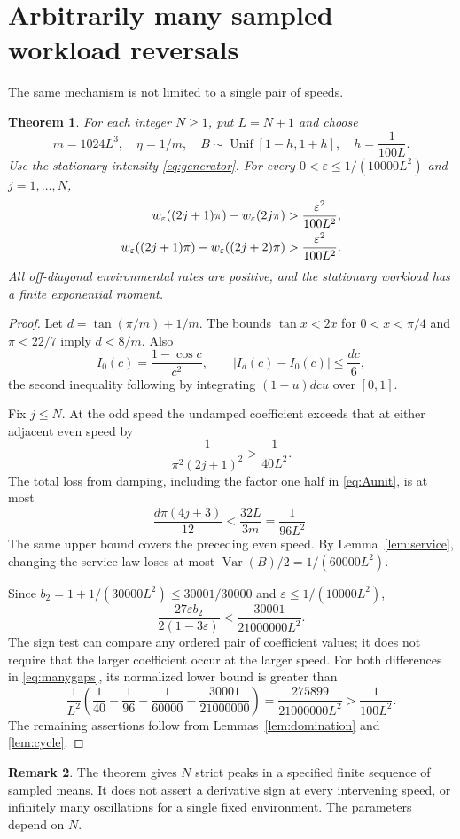 \documentclass[11pt,reqno]{amsart}
\numberwithin{equation}{section}
\theoremstyle{plain}
\newtheorem{theorem}{Theorem}[section]
\theoremstyle{definition}
\newtheorem{remark}[theorem]{Remark}
\newcommand{\1}{\mathbf 1}
\newcommand{\eps}{\varepsilon}
\DeclareMathOperator{\Var}{Var}
\DeclareMathOperator{\Unif}{Unif}
\begin{document}
\section{Arbitrarily many sampled workload reversals}\label{sec:many}
The same mechanism is not limited to a single pair of speeds.
\begin{theorem}\label{thm:many}
For each integer $N\ge1$, put $L=N+1$ and choose
\begin{equation}\label{eq:manyparameters}
 m=1024L^3,\quad \eta=1/m,\quad
 B\sim\Unif[1-h,1+h],\quad h=\frac1{100L}.
\end{equation}
Use the stationary intensity \eqref{eq:generator}. For every $0<\eps\le1/(10000L^2)$ and $j=1,\ldots,N$,
\begin{align}\label{eq:manygaps}
 w_\eps((2j+1)\pi)-w_\eps(2j\pi)&>\frac{\eps^2}{100L^2},\notag\\
 w_\eps((2j+1)\pi)-w_\eps((2j+2)\pi)&>\frac{\eps^2}{100L^2}.
\end{align}
All off-diagonal environmental rates are positive, and the stationary workload has a finite exponential moment.
\end{theorem}
\begin{proof}
Let $d=\tan(\pi/m)+1/m$. The bounds $\tan x<2x$ for $0<x<\pi/4$ and $\pi<22/7$ imply $d<8/m$. Also
\[
 I_0(c)=\frac{1-\cos c}{c^2},\qquad
 |I_d(c)-I_0(c)|\le\frac{dc}{6},
\]
the second inequality following by integrating $(1-u)dcu$ over $[0,1]$.

Fix $j\le N$. At the odd speed the undamped coefficient exceeds that at either adjacent even speed by
\[
 \frac{1}{\pi^2(2j+1)^2}>\frac1{40L^2}.
\]
The total loss from damping, including the factor one half in \eqref{eq:Aunit}, is at most
\[
 \frac{d\pi(4j+3)}{12}<\frac{32L}{3m}=\frac1{96L^2}.
\]
The same upper bound covers the preceding even speed. By Lemma~\ref{lem:service}, changing the service law loses at most $\Var(B)/2=1/(60000L^2)$.

Since $b_2=1+1/(30000L^2)\le30001/30000$ and $\eps\le1/(10000L^2)$,
\[
 \frac{27\eps b_2}{2(1-3\eps)}<\frac{30001}{21000000L^2}.
\]
The sign test can compare any ordered pair of coefficient values; it does not require that the larger coefficient occur at the larger speed. For both differences in \eqref{eq:manygaps}, its normalized lower bound is greater than
\[
 \frac1{L^2}\left(\frac1{40}-\frac1{96}-\frac1{60000}
                         -\frac{30001}{21000000}\right)
 =\frac{275899}{21000000L^2}>\frac1{100L^2}.
\]
The remaining assertions follow from Lemmas~\ref{lem:domination} and \ref{lem:cycle}.
\end{proof}
\begin{remark}
The theorem gives $N$ strict peaks in a specified finite sequence of sampled means. It does not assert a derivative sign at every intervening speed, or infinitely many oscillations for a single fixed environment. The parameters depend on $N$.
\end{remark}
\end{document}
